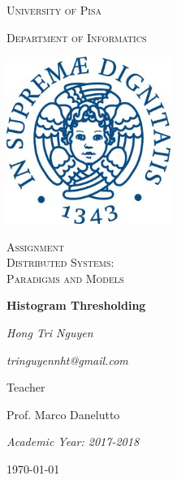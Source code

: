 \documentclass[14pt,a4paper]{report}
\begin{document}
	\begin{titlepage}
		\centering
		{\scshape\LARGE University of Pisa \par}
		{\scshape Department of Informatics\par}
		\vspace{1.0cm}
		\includegraphics[width=0.4\textwidth]{image/Unipi_Image}\par\vspace{1cm}
		
		\vspace{0.5cm}
		{\scshape\Large Assignment\\Distributed Systems:\\Paradigms and Models \par}
		\vspace{1.cm}
		{\huge\bfseries Histogram Thresholding\par}
		\vspace{2cm}
		{\Large\itshape Hong Tri Nguyen \par}
		{\Large\itshape tringuyennht@gmail.com\par}
		\vspace{2cm}

		\vfill
		Teacher\par
		Prof. Marco Danelutto
		\vfill
		{\Large\itshape Academic Year: 2017-2018\par}
		\vfill
		{\large \today\par}

	\end{titlepage}
\end{document}
